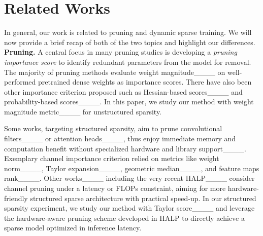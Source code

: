 \section{Related Works}
\label{sec:related}
In general, our work is related to pruning and dynamic sparse training. We will now provide a brief recap of both of the two topics and highlight our differences.\\
\textbf{Pruning.}
A central focus in many pruning studies is developing a \emph{pruning importance score} to identify redundant parameters from the model for removal. The majority of pruning methods evaluate weight magnitude____ on well-performed pretrained dense weights as importance scores. 
There have also been other importance criterion proposed such as Hessian-based scores____ and probability-based scores____. In this paper, we study our method with weight magnitude metric____ for unstructured sparsity. 

Some works, targeting structured sparsity, aim to prune convolutional filters____ or attention heads____, thus enjoy immediate memory and computation benefit without specialized hardware and library support____. Exemplary channel importance criterion relied on metrics like weight norm____, Taylor expansion____, geometric median____, and feature maps rank____. Other works____ including the very recent HALP____ consider channel pruning under a latency or FLOPs constraint, aiming for more hardware-friendly structured sparse architecture with practical speed-up. In our structured sparsity experiment, we study our method with Taylor score____ and leverage the hardware-aware pruning scheme developed in HALP to directly achieve a sparse model optimized in inference latency.

